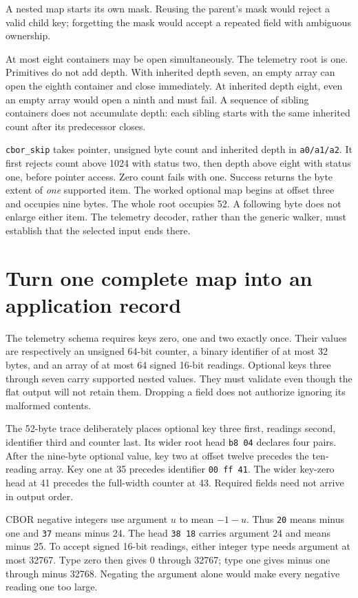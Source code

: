A nested map starts its own mask.
Reusing the parent's mask would reject a valid child key; forgetting the mask
would accept a repeated field with ambiguous ownership.

At most eight containers may be open simultaneously. The telemetry root is
one. Primitives do not add depth. With inherited depth seven, an empty array
can open the eighth container and close immediately. At inherited depth eight,
even an empty array would open a ninth and must fail. A sequence of sibling
containers does not accumulate depth: each sibling starts with the same
inherited count after its predecessor closes.

\texttt{cbor\_skip} takes pointer, unsigned byte count and inherited depth in
\texttt{a0/a1/a2}. It first rejects count above 1024 with status two, then depth
above eight with status one, before pointer access. Zero count fails with one.
Success returns the byte extent of \emph{one} supported item. The worked optional
map begins at offset three and occupies nine bytes. The whole root occupies 52.
A following byte does not enlarge either item. The telemetry decoder, rather
than the generic walker, must establish that the selected input ends there.

\section{Turn one complete map into an application record}

The telemetry schema requires keys zero, one and two exactly once. Their values
are respectively an unsigned 64-bit counter, a binary identifier of at most 32
bytes, and an array of at most 64 signed 16-bit readings. Optional keys three
through seven carry supported nested values. They must validate even though the
flat output will not retain them. Dropping a field does not authorize ignoring
its malformed contents.

The 52-byte trace deliberately places optional key three first, readings second,
identifier third and counter last. Its wider root head \texttt{b8 04} declares
four pairs. After the nine-byte optional value, key two at offset twelve precedes
the ten-reading array. Key one at 35 precedes identifier \texttt{00 ff 41}.
The wider key-zero head at 41 precedes the full-width counter at 43. Required
fields need not arrive in output order.



CBOR negative integers use argument $u$ to mean $-1-u$. Thus \texttt{20} means
minus one and \texttt{37} means minus 24. The head \texttt{38 18} carries
argument 24 and means minus 25. To accept signed 16-bit readings, either
integer type needs argument at most 32767. Type zero then gives 0 through 32767;
type one gives minus one through minus 32768. Negating the argument alone would
make every negative reading one too large.

